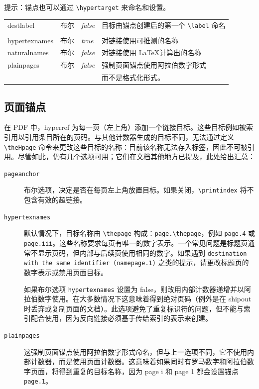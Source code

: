 \documentclass{article}
\newcommand*{\cs}[1]{%
  \texttt{\textbackslash #1}%
}
\newcommand*{\xpackage}[1]{\textsf{#1}}
\begin{document}
提示：锚点也可以通过 \cs{hypertarget} 来命名和设置。

\medskip
\begin{longtable}{>{\ttfamily}ll>{\itshape}ll}
destlabel      & 布尔 & false & 目标由锚点创建后的第一个 \cs{label} 命名\\
               &         &       & \\
hypertexnames  & 布尔 & true  & 对链接使用可推测的名称 \\
naturalnames   & 布尔 & false & 对链接使用 \LaTeX 计算出的名称 \\
plainpages     & 布尔 & false & 强制页面锚点使用阿拉伯数字形式 \\
               &         &       & 而不是格式化形式。 \\
\end{longtable}

\subsection{页面锚点}

在 PDF 中，\xpackage{hyperref} 为每一页（左上角）添加一个链接目标。这些目标例如被索引用以引用条目所在的页码。与其他计数器生成的目标不同，无法通过定义 \cs{theHpage} 命令来更改这些目标的名称：目前该名称无法存入标签，因此不可被引用。尽管如此，仍有几个选项可用；它们在文档其他地方已提及，此处给出汇总：

\begin{description}
\item[\texttt{pageanchor}] 布尔选项，决定是否在每页左上角放置目标。如果关闭，\verb|\printindex| 将不包含有效的超链接。
\item[\texttt{hypertexnames}] 默认情况下，目标名称由 \cs{thepage} 构成：\verb|page.\thepage|，例如 \texttt{page.4} 或 \texttt{page.iii}。这些名称要求每页有唯一的数字表示。一个常见问题是标题页通常不显示页码，但内部与后续页使用相同的数字。如果遇到 \texttt{destination with the same identifier (name{page.1})} 之类的提示，请更改标题页的数字表示或禁用页面目标。

    如果布尔选项 \texttt{hypertexnames} 设置为 false，则改用内部计数器递增并以阿拉伯数字使用。在大多数情况下这意味着得到绝对页码（例外是在 shipout 时丢弃或复制页面的文档）。此选项避免了重复标识符的问题，但不能与索引配合使用，因为反向链接必须基于传给索引的表示来创建。
\item[\texttt{plainpages}] 这强制页面锚点使用阿拉伯数字形式命名，但与上一选项不同，它不使用内部计数器，而是使用页面计数器。这意味着如果同时有罗马数字和阿拉伯数字页面，将得到重复的目标名称，因为 page i 和 page 1 都会设置锚点 \texttt{page.1}。
\end{description}
\end{document}
